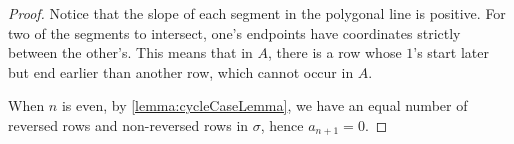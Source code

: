 \documentclass[10pt,a4paper]{amsart}
\DeclareMathOperator{\Pet}{Pet}
\begin{document}
        \begin{proof}
           Notice that the slope of each segment in the polygonal line is positive. For two of the segments to intersect, one's endpoints have coordinates strictly between the other's. This means that in $A$, there is a row whose $1$'s start later but end earlier than another row, which cannot occur in $A$.
        
           When $n$ is even, by \cref{lemma:cycleCaseLemma}, we have an equal number of reversed rows and non-reversed rows in $\sigma$, hence $a_{n+1}=0$.

           
				

\end{proof}
\end{document}
